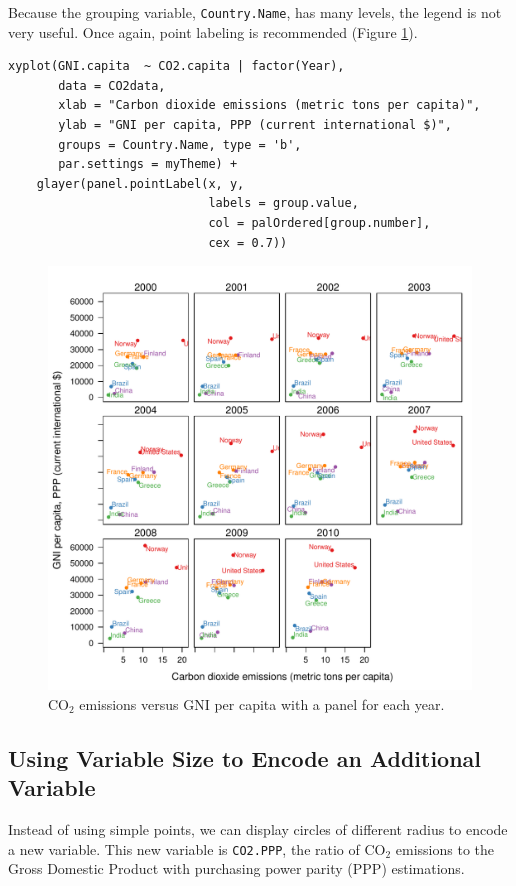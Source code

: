 Because the grouping variable, \texttt{Country.Name}, has many levels, the
legend is not very useful. Once again, point labeling is recommended
(Figure \ref{fig:CO2-GNI-panel-labels}).

\lstset{language=r,label= ,caption= ,captionpos=b,numbers=none}
\begin{lstlisting}
xyplot(GNI.capita  ~ CO2.capita | factor(Year),
       data = CO2data,
       xlab = "Carbon dioxide emissions (metric tons per capita)",
       ylab = "GNI per capita, PPP (current international $)",
       groups = Country.Name, type = 'b',
       par.settings = myTheme) + 
    glayer(panel.pointLabel(x, y,
                            labels = group.value,
                            col = palOrdered[group.number],
                            cex = 0.7))
\end{lstlisting}

\begin{figure}[htbp]
\centering
\includegraphics[width=.9\linewidth]{figs/CO2_capita_panel_labels.pdf}
\caption{\(\mathrm{CO_2}\) emissions versus GNI per capita with a panel for each year. \label{fig:CO2-GNI-panel-labels}}
\end{figure}

\subsection{\floweroneleft Using Variable Size to Encode an Additional Variable}
\label{sec:orgfd6cb66}
Instead of using simple points, we can display circles of
different radius to encode a new variable. This new variable is
\texttt{CO2.PPP}, the ratio of \(\mathrm{CO_2}\) emissions to the Gross Domestic
Product with purchasing power parity (PPP) estimations.

